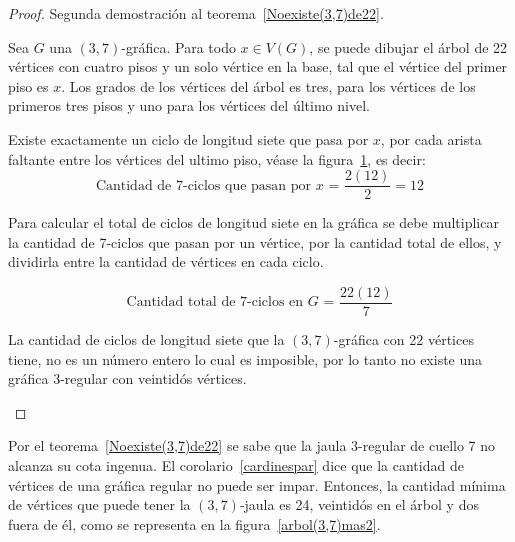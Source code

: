 \documentclass[12pt]{book}
\theoremstyle{definition}
\begin{document}
\begin{proof} Segunda demostración al teorema~\ref{Noexiste(3,7)de22}.
 
Sea $G$ una $(3,7)$-gráfica. Para todo $x\in V(G)$, se
puede dibujar el árbol de 22 vértices con cuatro pisos y un solo
vértice en la base, tal que el
vértice del primer piso es $x$. Los grados de los vértices del árbol
es tres, para los vértices de los primeros tres pisos y uno para los
vértices del último nivel.

Existe exactamente un ciclo de longitud siete que pasa por $x$, por cada
arista faltante entre los vértices del ultimo piso,
véase la figura~\ref{arbol(3,7)contarciclos}, es decir:
\begin{equation*}
\text{Cantidad de 7-ciclos que pasan por $x$ = }\frac{2(12)}{2}=12
\end{equation*}

Para calcular el total de ciclos de longitud siete en la gráfica se
debe multiplicar la cantidad de 7-ciclos que pasan por
un vértice, por la
cantidad total de ellos, y dividirla entre la cantidad de
vértices en cada ciclo.

\begin{equation*}
\text{Cantidad total de 7-ciclos en $G$ = } \frac{22(12)}{7}  
\end{equation*}

La cantidad de ciclos de longitud siete que la $(3,7)$-gráfica con 22
vértices tiene, no es un
número entero lo cual es
imposible, por lo tanto no existe una gráfica $3$-regular con
veintidós vértices.


\begin{figure}
  \centering

  \caption{} \label{arbol(3,7)contarciclos}
\end{figure}

\end{proof}

Por el teorema~\ref{Noexiste(3,7)de22} se sabe que la jaula $3$-regular
de cuello 7 no alcanza su cota ingenua. El corolario~\ref{cardinespar} dice que la cantidad de vértices de
una gráfica regular no
puede ser impar. Entonces, la cantidad mínima de vértices que puede
tener la $(3,7)$-jaula es 24, veintidós en el árbol y dos fuera de él,
como se representa en la figura~\ref{arbol(3,7)mas2}.
\end{document}
